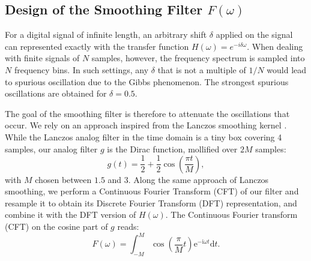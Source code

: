 \documentclass[]{usiinfbachelorproject}
\begin{document}
		
		
		
		
		
		\subsection{Design of the Smoothing Filter $F(\omega)$}
		For a digital signal of infinite length,  an arbitrary shift $\delta$ applied on the signal can represented exactly with the transfer function $H(\omega) = e^{-i\delta\omega}$. 
		When dealing with finite signals of $N$ samples, however, the frequency spectrum is sampled into $N$ frequency bins.  In such settings, any $\delta$ that is not a multiple of $1 / N$ would lead to spurious oscillation  due to the Gibbs phenomenon. The strongest spurious oscillations are obtained for $\delta = 0.5$.
		
		The goal of the smoothing filter is therefore to attenuate the oscillations that occur.
		We rely on an approach inspired from the Lanczos smoothing kernel \cite{hamming1998digital}.
		While the Lanczos analog filter in the time domain is a tiny box covering 4 samples, our analog filter $g$ is the Dirac function, mollified over $2M$ samples:
		\begin{equation}\label{filter_formula}
			g(t) = \frac{1}{2} + \frac{1}{2} \cos(\frac{\pi t}{M}),
		\end{equation}
		with $M$ chosen between $1.5$ and $3$. 
		Along the same approach of Lanczos smoothing, we perform a Continuous Fourier Transform (CFT) of our filter and resample it to obtain its Discrete Fourier Transform (DFT) representation, and combine it with the DFT version of $H(\omega)$.
		The Continuous Fourier transform (CFT) on the cosine part of $g$ reads:
		\begin{equation}
			F(\omega) = \int_{-M}^{M} \cos(\frac{\pi}{M}t)\mathrm{e}^{-\mathrm{i}\omega t}\mathrm{d}t.
		\end{equation}
		
\end{document}
